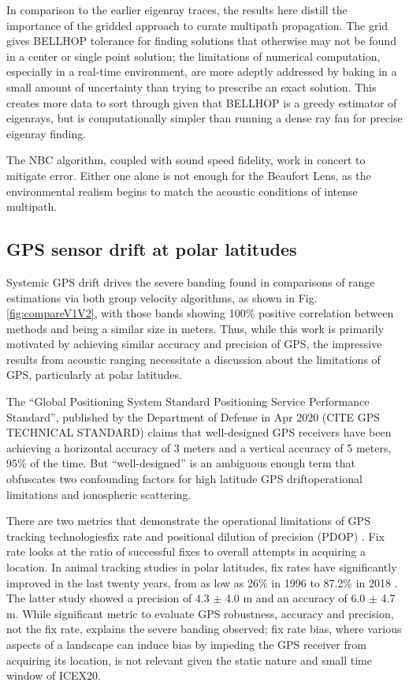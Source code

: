 In comparison to the earlier eigenray traces, the results here distill the importance of the gridded approach to curate multipath propagation. 
The grid gives BELLHOP tolerance for finding solutions that otherwise may not be found in a center or single point solution; the limitations of numerical computation, especially in a real-time environment, are more adeptly addressed by baking in a small amount of uncertainty than trying to prescribe an exact solution.
This creates more data to sort through given that BELLHOP is a greedy estimator of eigenrays, but is computationally simpler than running a dense ray fan for precise eigenray finding.

The NBC algorithm, coupled with sound speed fidelity, work in concert to mitigate error.
Either one alone is not enough for the Beaufort Lens, as the environmental realism begins to match the acoustic conditions of intense multipath.

\FloatBarrier
\subsection{GPS sensor drift at polar latitudes}

Systemic GPS drift drives the severe banding found in comparisons of range estimations via both group velocity algorithms, as shown in Fig. \ref{fig:compareV1V2}, with those bands showing 100\% positive correlation between methods and being a similar size in meters.
Thus, while this work is primarily motivated by achieving similar accuracy and precision of GPS, the impressive results from acoustic ranging necessitate a discussion about the limitations of GPS, particularly at polar latitudes.

The ``Global Positioning System Standard Positioning Service Performance Standard'', published by the Department of Defense in Apr 2020 (CITE GPS TECHNICAL STANDARD) claims that well-designed GPS receivers have been achieving a horizontal accuracy of 3 meters and a vertical accuracy of 5 meters, 95\% of the time.
But ``well-designed'' is an ambiguous enough term that obfuscates two confounding factors for high latitude GPS drift\textemdash operational limitations and ionospheric scattering.

There are two metrics that demonstrate the operational limitations of GPS tracking technologies\textemdash fix rate and positional dilution of precision (PDOP) \citep{swanlund_gps_2016}.
Fix rate looks at the ratio of successful fixes to overall attempts in acquiring a location.
In animal tracking studies in polar latitudes, fix rates have significantly improved in the last twenty years, from as low as 26\% in 1996 \citep{moen_effects_1996} to 87.2\% in 2018 \citep{jung_accuracy_2018}.
The latter study showed a precision of 4.3 $\pm$ 4.0 m and an accuracy of 6.0 $\pm$ 4.7 m.
While significant metric to evaluate GPS robustness, accuracy and precision, not the fix rate, explains the severe banding observed; fix rate bias, where various aspects of a landscape can induce bias by impeding the GPS receiver from acquiring its location, is not relevant given the static nature and small time window of ICEX20.

